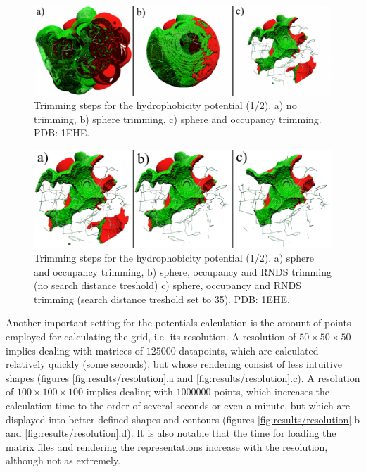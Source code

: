     \begin{figure}[H]
      \centering
      \includegraphics[width=1\textwidth]{figures/results/trimming_0.png}
      \caption{\label{fig:results/trimming_0} Trimming steps for the hydrophobicity potential (1/2). a) no trimming, b) sphere trimming, c) sphere and occupancy trimming. PDB: 1EHE.}
    \end{figure}

    \begin{figure}[H]
      \centering
      \includegraphics[width=1\textwidth]{figures/results/trimming_1.png}
      \caption{\label{fig:results/trimming_1} Trimming steps for the hydrophobicity potential (1/2). a) sphere and occupancy trimming, b) sphere, occupancy and RNDS trimming (no search distance treshold) c) sphere, occupancy and RNDS trimming (search distance treshold set to 35). PDB: 1EHE.}
    \end{figure}

    Another important setting for the potentials calculation is the amount of points employed for calculating the grid, i.e. its resolution. A resolution of $50 \times 50 \times 50$ implies dealing with matrices of $125000$ datapoints, which are calculated relatively quickly (some seconds), but whose rendering consist of less intuitive shapes (figures \ref{fig:results/resolution}.a and \ref{fig:results/resolution}.c). A resolution of $100 \times 100 \times 100$ implies dealing with $1000000$ points, which increases the calculation time to the order of several seconds or even a minute, but which are displayed into better defined shapes and contours (figures \ref{fig:results/resolution}.b and \ref{fig:results/resolution}.d). It is also notable that the time for loading the matrix files and rendering the representations increase with the resolution, although not as extremely.


